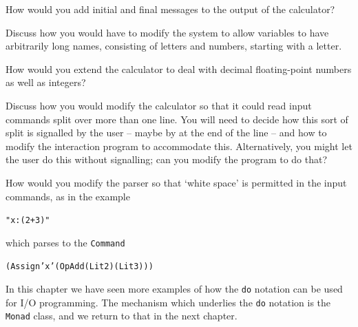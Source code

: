 \begin{exercises}

\item
How would you add initial and final messages to the output of the calculator?

\item
Discuss how you would have to modify the system to allow variables to have
arbitrarily long names, consisting of letters and numbers, starting with a
letter.

\item
How would you extend the calculator to deal with decimal floating-point numbers
as well as
integers?

\item
Discuss how you would modify the calculator so that it could read input
commands split over more than one line. You will need to decide how this
sort of split is signalled by the user -- maybe by \texttt{\bs{}} at the end of the line --
and how to modify the interaction program to accommodate this.
Alternatively, you might let the user do this without signalling; can
you modify the program to do that?

\item
How would you modify the parser so that `white space' is permitted in
the input commands, as in the example
\begin{alltt}
"    x : (2+3)     "
\end{alltt}
which parses to the \texttt{Command}
\begin{alltt}
(Assign 'x' (Op Add (Lit 2) (Lit 3)))
\end{alltt}
\end{exercises}



\begin{summary}%

In this chapter we have seen more examples of how the \texttt{do} notation can be used for I/O programming. The mechanism which underlies the \texttt{do} notation is the \texttt{Monad} class, and we return to that in the next chapter.

\end{summary}

%
